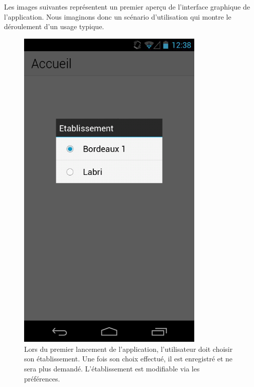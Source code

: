 \documentclass [pdftex,12pt] {report}
\begin{document}
Les images suivantes représentent un premier aperçu de l'interface graphique de l'application. Nous imaginons donc un scénario d'utilisation qui montre le déroulement d'un usage typique. 

\begin{figure}
  \begin{minipage}[t]{8cm}
    \centering
    \includegraphics[width=0.8\textwidth]{resources/ui_preview/01}
    \caption{Lors du premier lancement de l'application, l'utilisateur doit choisir son établissement. Une fois son choix effectué, il est enregistré et ne sera plus demandé. L'établissement est modifiable via les préférences.}
    \label{fig:01}
  \end{minipage}
  \hspace{+20pt}
  \begin{minipage}[t]{8cm}
    \centering

\end{minipage}
\end{figure}
\end{document}
